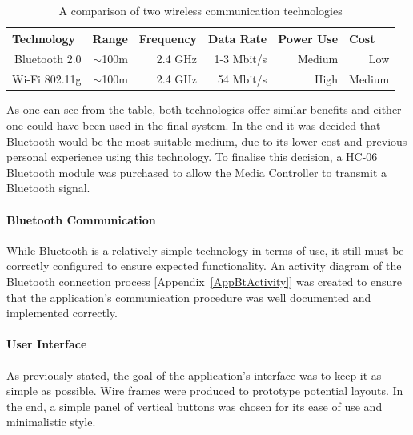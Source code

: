\documentclass{article}
\begin{document}
			\begin{table}[h]
				\centering
				\caption{A comparison of two wireless communication technologies}
				\label{btWiFiComparison}
				\begin{tabular}{|r|r|r|r|r|r|}
					\hline
					\multicolumn{1}{|l|}{Technology} & \multicolumn{1}{l|}{Range} & \multicolumn{1}{l|}{Frequency} & \multicolumn{1}{l|}{Data Rate} & \multicolumn{1}{l|}{Power Use} & \multicolumn{1}{l|}{Cost} \\ \hline
					Bluetooth 2.0                    & $\sim$100m                 & 2.4 GHz                        & 1-3 Mbit/s                     & Medium                         & Low                       \\
					Wi-Fi 802.11g                     & $\sim$100m                 & 2.4 GHz                        & 54 Mbit/s                      & High                           & Medium                    \\ \hline
				\end{tabular}
			\end{table}
			
			\noindent
			As one can see from the table, both technologies offer similar benefits and either one could have been used in the final system. In the end it was decided that Bluetooth would be the most suitable medium, due to its lower cost and previous personal experience using this technology. To finalise this decision, a HC-06 Bluetooth module \cite{HC06DataSheet:online} was purchased to allow the Media Controller to transmit a Bluetooth signal.
			
			\paragraph{Bluetooth Communication}
			While Bluetooth is a relatively simple technology in terms of use, it still must be correctly configured to ensure expected functionality. An activity diagram of the Bluetooth connection process [Appendix~\ref{AppBtActivity}] was created to ensure that the application's communication procedure was well documented and implemented correctly.
			
			\paragraph{User Interface}
			As previously stated, the goal of the application's interface was to keep it as simple as possible. Wire frames were produced to prototype potential layouts. In the end, a simple panel of vertical buttons was chosen for its ease of use and minimalistic style.
			
\end{document}
